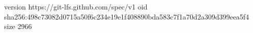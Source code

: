 version https://git-lfs.github.com/spec/v1
oid sha256:498c73082d0715a50f6c234e19e1f408890bda583c7f1a70d2a309d399eea5f4
size 2966
